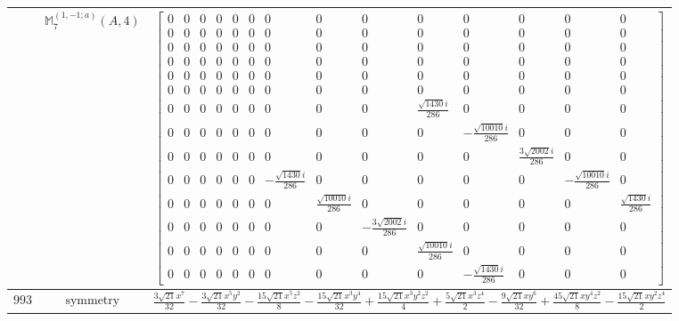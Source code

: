 \documentclass[fleqn,8pt,landscape]{jsarticle}
\begin{document}
\begin{longtable}{ccc}
$  $ & $ \mathbb{M}_{7}^{(1,-1;a)}(A,4) $ & $ \begin{bmatrix} 0 & 0 & 0 & 0 & 0 & 0 & 0 & 0 & 0 & 0 & 0 & 0 & 0 & 0 \\ 0 & 0 & 0 & 0 & 0 & 0 & 0 & 0 & 0 & 0 & 0 & 0 & 0 & 0 \\ 0 & 0 & 0 & 0 & 0 & 0 & 0 & 0 & 0 & 0 & 0 & 0 & 0 & 0 \\ 0 & 0 & 0 & 0 & 0 & 0 & 0 & 0 & 0 & 0 & 0 & 0 & 0 & 0 \\ 0 & 0 & 0 & 0 & 0 & 0 & 0 & 0 & 0 & 0 & 0 & 0 & 0 & 0 \\ 0 & 0 & 0 & 0 & 0 & 0 & 0 & 0 & 0 & 0 & 0 & 0 & 0 & 0 \\ 0 & 0 & 0 & 0 & 0 & 0 & 0 & 0 & 0 & \frac{\sqrt{1430} i}{286} & 0 & 0 & 0 & 0 \\ 0 & 0 & 0 & 0 & 0 & 0 & 0 & 0 & 0 & 0 & - \frac{\sqrt{10010} i}{286} & 0 & 0 & 0 \\ 0 & 0 & 0 & 0 & 0 & 0 & 0 & 0 & 0 & 0 & 0 & \frac{3 \sqrt{2002} i}{286} & 0 & 0 \\ 0 & 0 & 0 & 0 & 0 & 0 & - \frac{\sqrt{1430} i}{286} & 0 & 0 & 0 & 0 & 0 & - \frac{\sqrt{10010} i}{286} & 0 \\ 0 & 0 & 0 & 0 & 0 & 0 & 0 & \frac{\sqrt{10010} i}{286} & 0 & 0 & 0 & 0 & 0 & \frac{\sqrt{1430} i}{286} \\ 0 & 0 & 0 & 0 & 0 & 0 & 0 & 0 & - \frac{3 \sqrt{2002} i}{286} & 0 & 0 & 0 & 0 & 0 \\ 0 & 0 & 0 & 0 & 0 & 0 & 0 & 0 & 0 & \frac{\sqrt{10010} i}{286} & 0 & 0 & 0 & 0 \\ 0 & 0 & 0 & 0 & 0 & 0 & 0 & 0 & 0 & 0 & - \frac{\sqrt{1430} i}{286} & 0 & 0 & 0 \end{bmatrix} $ \\ \hline
$ 993 $ & $ \text{symmetry} $ & $ \frac{3 \sqrt{21} x^{7}}{32} - \frac{3 \sqrt{21} x^{5} y^{2}}{32} - \frac{15 \sqrt{21} x^{5} z^{2}}{8} - \frac{15 \sqrt{21} x^{3} y^{4}}{32} + \frac{15 \sqrt{21} x^{3} y^{2} z^{2}}{4} + \frac{5 \sqrt{21} x^{3} z^{4}}{2} - \frac{9 \sqrt{21} x y^{6}}{32} + \frac{45 \sqrt{21} x y^{4} z^{2}}{8} - \frac{15 \sqrt{21} x y^{2} z^{4}}{2} $ \\

\end{longtable}
\end{document}
